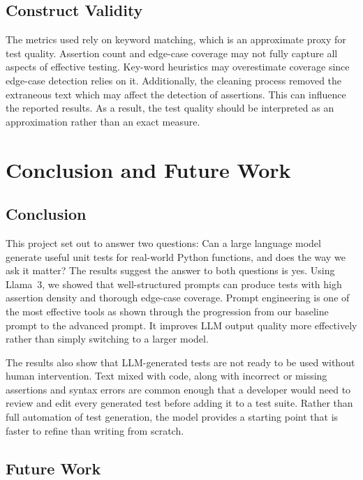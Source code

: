 \documentclass[conference]{IEEEtran}
\begin{document}
\subsection{Construct Validity}

The metrics used rely on keyword matching, which is an approximate proxy for test quality. Assertion count and edge-case coverage may not fully capture all aspects of effective testing. Key-word heuristics may overestimate coverage since edge-case detection relies on it. Additionally, the cleaning process removed the extraneous text which may affect the detection of assertions. This can influence the reported results. As a result, the test quality should be interpreted as an approximation rather than an exact measure. 

\section{Conclusion and Future Work}

\subsection{Conclusion}

This project set out to answer two questions: Can a large language model generate useful unit tests for real-world Python functions, and does the way we ask it matter? The results suggest the answer to both questions is yes. Using Llama~3, we showed that well-structured prompts can produce tests with high assertion density and thorough edge-case coverage. Prompt engineering is one of the most effective tools as shown through the progression from our baseline prompt to the advanced prompt. It improves LLM output quality more effectively rather than simply switching to a larger model.

The results also show that LLM-generated tests are not ready to be used without human intervention. Text mixed with code, along with incorrect or missing assertions and syntax errors are common enough that a developer would need to review and edit every generated test before adding it to a test suite. Rather than full automation of test generation, the model provides a starting point that is faster to refine than writing from scratch.

\subsection{Future Work}
\end{document}
